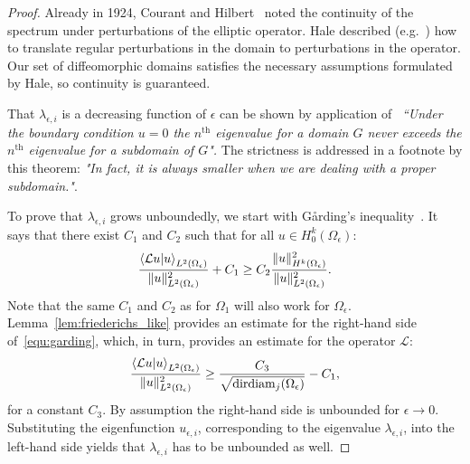 \begin{proof}
  Already in 1924, Courant and Hilbert~\cite[vol I. chapter V. paragraph 13]{courant_methods_2008} noted the continuity of the spectrum under perturbations of the elliptic operator. Hale described (e.g.~\cite{hale_eigenvalues_2005}) how to translate regular perturbations in the domain to perturbations in the operator. Our set of diffeomorphic domains satisfies the necessary assumptions formulated by Hale, so continuity is guaranteed.

  That $\lambda_{\epsilon, i}$ is a decreasing function of $\epsilon$ can be shown by application of~\cite[vol I, chapter  VI, paragraph 2, theorem 3]{courant_methods_2008} \emph{``Under the boundary condition $u = 0$ the $n^\text{th}$ eigenvalue for a domain $G$ never exceeds the $n^\text{th}$ eigenvalue for a subdomain of $G$".} The strictness is addressed in a footnote by this theorem: \emph{"In fact, it is always smaller when we are dealing with a proper subdomain."}.

  To prove that $\lambda_{\epsilon, i}$ grows unboundedly, we start with Gårding's inequality~\cite[section 9.2.3]{renardy_introduction_2004}. It says that there exist $C_1$ and $C_2$ such that for all $u \in H^k_0(\Omega_\epsilon)$:
  \begin{equation}\label{equ:garding}
    \frac{\bra{\mathcal{L}u}\ket{u}_{L^2(\Omega_\epsilon)}}{\|u\|_{L^2(\Omega_\epsilon)}^2} + C_1 \geq C_2 \frac{\|u\|_{H^k(\Omega_\epsilon)}^2}{\|u\|_{L^2(\Omega_\epsilon)}^2}\text{.}
  \end{equation}
  Note that the same $C_1$ and $C_2$ as for $\Omega_1$ will also work for $\Omega_\epsilon$. Lemma~\ref{lem:friederichs_like} provides an estimate for the right-hand side of~\eqref{equ:garding}, which, in turn, provides an estimate for the operator $\mathcal{L}$:
  $$
    \frac{\bra{\mathcal{L}u}\ket{u}_{L^2(\Omega_\epsilon)}}{\|u\|_{L^2(\Omega_\epsilon)}^2} \geq \frac{C_3}{\sqrt{\operatorname{dirdiam}_j(\Omega_\epsilon)}} - C_1\text{,}
  $$
  for a constant $C_3$. By assumption the right-hand side is unbounded for $\epsilon \to 0$. Substituting the eigenfunction $u_{\epsilon, i}$, corresponding to the eigenvalue $\lambda_{\epsilon, i}$, into the left-hand side yields that $\lambda_{\epsilon, i}$ has to be unbounded as well.
\end{proof}

